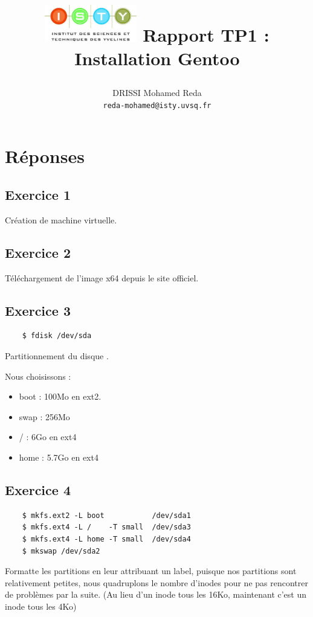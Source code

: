 \documentclass{report}
\begin{document}
\title{
  \begin{minipage}\linewidth
      \centering
      \includegraphics[width=40mm]{resources/01.png}\vskip 20pt
      Rapport TP1 : Installation Gentoo
      \vskip 5pt
      \author{
        DRISSI Mohamed Reda \\
        \texttt{reda-mohamed@isty.uvsq.fr}
      }
    \end{minipage}
}
\maketitle
\newpage
\tableofcontents
\newpage
\section{Réponses}
\subsection{Exercice 1}
Création de machine virtuelle.
\subsection{Exercice 2}
Téléchargement de l'image x64 depuis le site officiel.
\subsection{Exercice 3}
\begin{tcolorbox}
  \begin{verbatim}
    $ fdisk /dev/sda
  \end{verbatim}
\end{tcolorbox}
Partitionnement du disque .

Nous choisissons :

\begin{itemize}
  \item boot : 100Mo en ext2.
  \item swap : 256Mo
  \item /    : 6Go en ext4
  \item home : 5.7Go en ext4
\end{itemize}

\subsection{Exercice 4}
\begin{tcolorbox}
  \begin{verbatim}
    $ mkfs.ext2 -L boot           /dev/sda1
    $ mkfs.ext4 -L /    -T small  /dev/sda3
    $ mkfs.ext4 -L home -T small  /dev/sda4
    $ mkswap /dev/sda2
  \end{verbatim}
\end{tcolorbox}
Formatte les partitions en leur attribuant un label, puisque nos partitions sont relativement petites, nous quadruplons
le nombre d'inodes pour ne pas rencontrer de problèmes par la suite. (Au lieu d'un inode tous les 16Ko, maintenant c'est un inode
tous les 4Ko)
\end{document}
